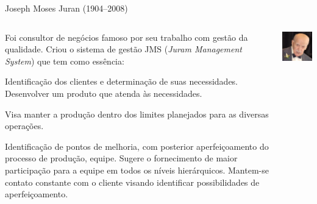\begin{frame}{Joseph Moses Juran (1904--2008)}  
  \begin{columns}\scriptsize
    \begin{column}{.7\textwidth}
      Foi consultor de negócios famoso por seu trabalho com  gestão da qualidade. Criou o sistema de gestão JMS (\emph{Juram Management System}) que tem como essência:
      \pause
      \begin{description}[<+->]
      \item[Planejamento da qualidade:] Identificação dos clientes e determinação de suas necessidades. Desenvolver um produto que atenda às necessidades.
      \item[Controle da qualidade:] Visa manter a produção dentro dos limites planejados para as diversas operações.
      \item[Melhoria da qualidade:] Identificação de pontos de melhoria, com posterior  aperfeiçoamento do processo de produção, equipe. Sugere o fornecimento de maior participação para a equipe em todos os níveis hierárquicos. Mantem-se contato constante com o cliente visando identificar possibilidades de aperfeiçoamento.
      \end{description}  
    \end{column}
      \begin{column}{.3\textwidth}
        \includegraphics[scale=.4]{img/juran.png}
      \end{column}
    \end{columns}
  \end{frame}

